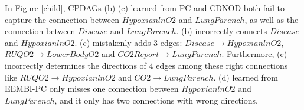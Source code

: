 \documentclass[twoside,11pt]{article}
\begin{document}
\begin{figure*}[htbp]
\centering



\caption{Parts of the CPDAG structure of CHILD dataset. (a) is the true CPDAG of CHILD dataset. (b) (c) (d) are the CPDAGs learned from PC, CDNOD, and EEMBI-PC algorithms.}\label{child}
\end{figure*}

In Figure \ref{child}, CPDAGs (b) (c) learned from PC and CDNOD both fail to capture the connection between $HypoxianlnO2$ and $LungParench$, as well as the connection between $Disease$ and $LungParench$. (b) incorrectly connects $Disease$ and $HypoxianlnO2$. (c) mistakenly adds 3 edges: $Disease\to HypoxianlnO2$, $RUQO2\to LowerBodyO2$ and $CO2Report\to LungParench$. Furthermore, (c) incorrectly determines the directions of 4 edges among these right connections like $RUQO2\to HypoxianlnO2$ and $CO2\to LungParench$. (d) learned from EEMBI-PC only misses one connection between $HypoxianlnO2$ and $LungParench$, and it only has two connections with wrong directions. 
\end{document}
